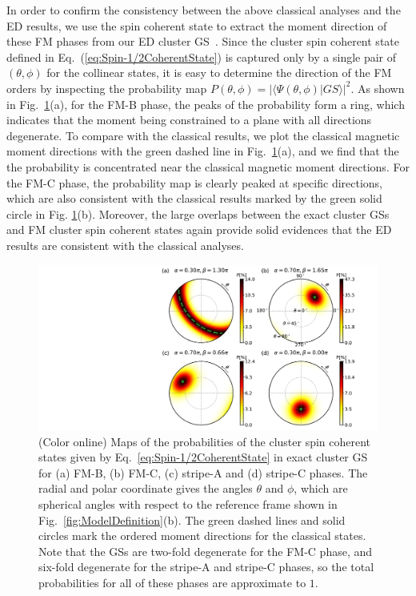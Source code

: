\documentclass[aps,prb,reprint,amsfonts,amsmath,amssymb,showpacs,groupedaddress,superscriptaddress]{revtex4-1}
\begin{document}
In order to confirm the consistency between the above classical analyses and the ED results, we use the spin coherent state to extract the moment direction of these FM phases from our ED cluster GS~\cite{PhysRevB.94.064435}. Since the cluster spin coherent state defined in Eq.~(\ref{eq:Spin-1/2CoherentState}) is captured only by a single pair of $(\theta, \phi)$ for the collinear states, it is easy to determine the direction of the FM orders by inspecting the probability map $P(\theta, \phi) = | \langle \Psi (\theta, \phi) | GS \rangle |^2$. As shown in Fig.~\ref{fig:Proabilities}(a), for the FM-B phase, the peaks of the probability form a ring, which indicates that the moment being constrained to a plane with all directions degenerate. To compare with the classical results, we plot the classical magnetic moment directions with the green dashed line in Fig.~\ref{fig:Proabilities}(a), and we find that the the probability is concentrated near the classical magnetic moment directions. For the FM-C phase, the probability map is clearly peaked at specific directions, which are also consistent with the classical results marked by the green solid circle in Fig. \ref{fig:Proabilities}(b). Moreover, the large overlaps between the exact cluster GSs and FM cluster spin coherent states again provide solid evidences that the ED results are consistent with the classical analyses.
\begin{figure}
    \centering
    \includegraphics[width=\columnwidth]{fig/Probabilities.pdf}
    \caption{\label{fig:Proabilities}(Color online) Maps of the probabilities of the cluster spin coherent states given by Eq.~\eqref{eq:Spin-1/2CoherentState} in exact cluster GS for (a) FM-B, (b) FM-C, (c) stripe-A and (d) stripe-C phases. The radial and polar coordinate gives the angles $\theta$ and $\phi$, which are spherical angles with respect to the reference frame shown in Fig.~\ref{fig:ModelDefinition}(b). The green dashed lines and solid circles mark the ordered moment directions for the classical states. Note that the GSs are two-fold degenerate for the FM-C phase, and six-fold degenerate for the stripe-A and stripe-C phases, so the total probabilities for all of these phases are approximate to $1$. }
\end{figure}
\end{document}
